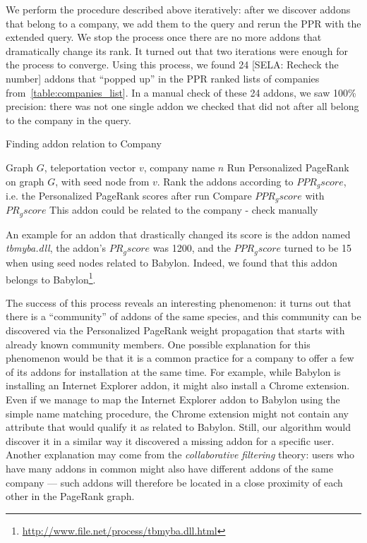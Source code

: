 \documentclass[11pt,oneside]{book}
\begin{document}
We perform the procedure described above iteratively: after we discover addons that belong to a company, we add them to the query and rerun the PPR with the extended query. We stop the process once there are no more addons that dramatically change its rank. It turned out that two iterations were enough for the process to converge. Using this process, we found 24 [SELA: Recheck the number] addons that ``popped up'' in the PPR ranked lists of companies from~\autoref{table:companies_list}. In a manual check of these 24 addons, we saw 100\% precision: there was not one single addon we checked that did not after all belong to the company in the query. 

\begin{algorithm}[!t]
\caption{Finding addon relation to Company}
\label{alg:find_addon_species}
\begin{algorithmic}[1] 
\REQUIRE Graph $G$, teleportation vector $v$, company name $n$
\STATE Run Personalized PageRank on graph $G$, with seed node from $v$.
\STATE Rank the addons according to $PPR_gscore$, i.e. the Personalized PageRank scores after run
\STATE Compare $PPR_gscore$ with $PR_gscore$
\STATE This addon could be related to the company - check manually
\ENDIF
\ENDFOR
\end{algorithmic}
\end{algorithm}

An example for an addon that drastically changed its score is the addon named \emph{tbmyba.dll}, the addon's $PR_gscore$ was 1200, and the $PPR_gscore$ turned to be 15 when using seed nodes related to Babylon. Indeed, we found that this addon belongs to Babylon\footnote{\url{http://www.file.net/process/tbmyba.dll.html}}.

The success of this process reveals an interesting phenomenon: it turns out that there is a ``community'' of addons of the same species, and this community can be discovered via the Personalized PageRank weight propagation that starts with already known community members. One possible explanation for this phenomenon would be that it is a common practice for a company to offer a few of its addons for installation at the same time. For example, while Babylon is installing an Internet Explorer addon, it might also install a Chrome extension. Even if we manage to map the Internet Explorer addon to Babylon using the simple name matching procedure, the Chrome extension might not contain any attribute that would qualify it as related to Babylon. Still, our algorithm would discover it in a similar way it discovered a missing addon for a specific user. 
Another explanation may come from the \emph{collaborative filtering} theory: users who have many addons in common might also have different addons of the same company --- such addons will therefore be located in a close proximity of each other in the PageRank graph.
\end{document}
